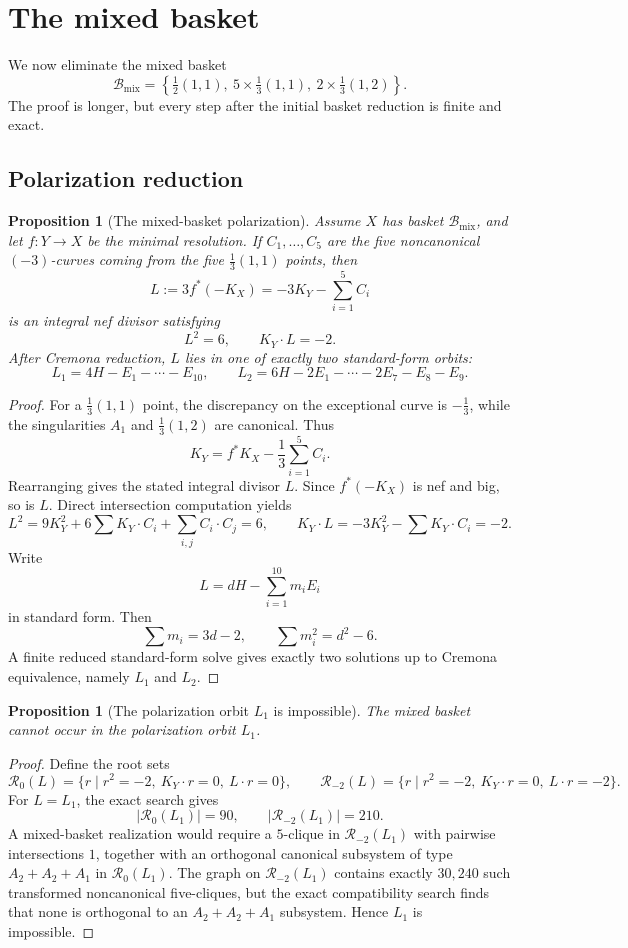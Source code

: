 \documentclass[11pt]{article}
\newtheorem{proposition}[theorem]{Proposition}
\theoremstyle{definition}
\begin{document}
\section{The mixed basket}\label{sec:mixed}
We now eliminate the mixed basket
\[
\mathcal B_{\mathrm{mix}}=\left\{\tfrac12(1,1),\ 5\times\tfrac13(1,1),\ 2\times\tfrac13(1,2)\right\}.
\]
The proof is longer, but every step after the initial basket reduction is finite and exact.

\subsection{Polarization reduction}

\begin{proposition}[The mixed-basket polarization]\label{prop:mixed-polarization}
Assume $X$ has basket $\mathcal B_{\mathrm{mix}}$, and let $f\colon Y\to X$ be the minimal resolution. If $C_1,\dots,C_5$ are the five noncanonical $(-3)$-curves coming from the five $\frac13(1,1)$ points, then
\[
L:=3f^*(-K_X)=-3K_Y-\sum_{i=1}^5C_i
\]
is an integral nef divisor satisfying
\[
L^2=6,\qquad K_Y\cdot L=-2.
\]
After Cremona reduction, $L$ lies in one of exactly two standard-form orbits:
\[
L_1=4H-E_1-\cdots-E_{10},
\qquad
L_2=6H-2E_1-\cdots-2E_7-E_8-E_9.
\]
\end{proposition}

\begin{proof}
For a $\frac13(1,1)$ point, the discrepancy on the exceptional curve is $-\frac13$, while the singularities $A_1$ and $\frac13(1,2)$ are canonical. Thus
\[
K_Y=f^*K_X-\frac13\sum_{i=1}^5C_i.
\]
Rearranging gives the stated integral divisor $L$. Since $f^*(-K_X)$ is nef and big, so is $L$. Direct intersection computation yields
\[
L^2=9K_Y^2+6\sum K_Y\cdot C_i+\sum_{i,j}C_i\cdot C_j=6,
\qquad
K_Y\cdot L=-3K_Y^2-\sum K_Y\cdot C_i=-2.
\]
Write
\[
L=dH-\sum_{i=1}^{10}m_iE_i
\]
in standard form. Then
\[
\sum m_i=3d-2,
\qquad
\sum m_i^2=d^2-6.
\]
A finite reduced standard-form solve gives exactly two solutions up to Cremona equivalence, namely $L_1$ and $L_2$.
\end{proof}

\begin{proposition}[The polarization orbit $L_1$ is impossible]\label{prop:L1-impossible}
The mixed basket cannot occur in the polarization orbit $L_1$.
\end{proposition}

\begin{proof}
Define the root sets
\[
\mathcal R_0(L)=\{r\mid r^2=-2,\ K_Y\cdot r=0,\ L\cdot r=0\},
\qquad
\mathcal R_{-2}(L)=\{r\mid r^2=-2,\ K_Y\cdot r=0,\ L\cdot r=-2\}.
\]
For $L=L_1$, the exact search gives
\[
|\mathcal R_0(L_1)|=90,
\qquad
|\mathcal R_{-2}(L_1)|=210.
\]
A mixed-basket realization would require a $5$-clique in $\mathcal R_{-2}(L_1)$ with pairwise intersections $1$, together with an orthogonal canonical subsystem of type $A_2+A_2+A_1$ in $\mathcal R_0(L_1)$. The graph on $\mathcal R_{-2}(L_1)$ contains exactly $30{,}240$ such transformed noncanonical five-cliques, but the exact compatibility search finds that none is orthogonal to an $A_2+A_2+A_1$ subsystem. Hence $L_1$ is impossible.
\end{proof}
\end{document}
